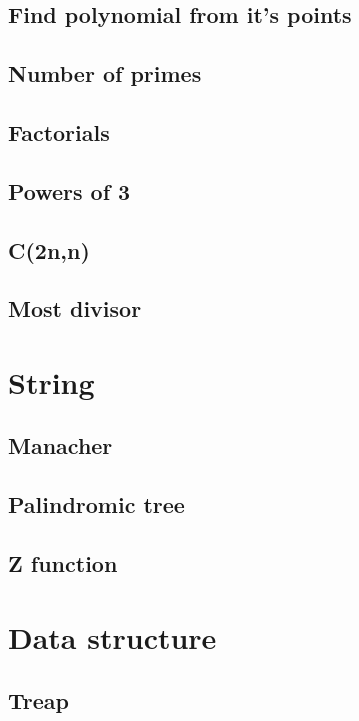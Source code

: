 \subsection{Find polynomial from it's points}

\hrulefill
\subsection{Number of primes}
\raggedbottom
\hrulefill
\subsection{Factorials}
\raggedbottom
\hrulefill
\subsection{Powers of 3}
\raggedbottom
\hrulefill
\subsection{C(2n,n)}
\raggedbottom
\hrulefill
\subsection{Most divisor}
\raggedbottom
\hrulefill

\section{String}
\subsection{Manacher}
\raggedbottom
\hrulefill
\subsection{Palindromic tree}
\raggedbottom
\hrulefill
\subsection{Z function}
\raggedbottom
\hrulefill

\section{Data structure}
\subsection{Treap}
\raggedbottom
\hrulefill



